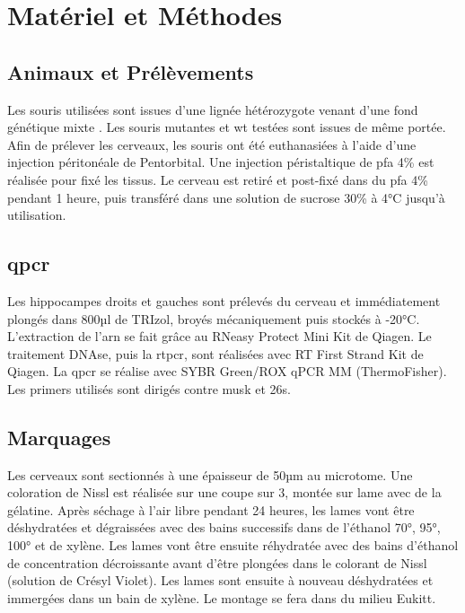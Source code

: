 \chapter{Matériel et Méthodes}

\section{Animaux et Prélèvements}
\label{sec:AnimEtPrelev}
	Les souris utilisées sont issues d'une lignée hétérozygote venant d'une fond génétique mixte \cite{Messeant2015, Messeant2017}. Les souris mutantes \mcrd et \gls{wt} testées sont issues de même portée. Afin de prélever les cerveaux, les souris ont été euthanasiées à l'aide d'une injection péritonéale de Pentorbital. Une injection péristaltique de \gls{pfa} 4\% est réalisée pour fixé les tissus. Le cerveau est retiré et post-fixé dans du \gls{pfa} 4\% pendant 1 heure, puis transféré dans une solution de sucrose 30\% à 4°C jusqu'à utilisation.
	
\section{\acrshort{qpcr}}
\label{sec:qPCR}
	Les hippocampes droits et gauches sont prélevés du cerveau et immédiatement plongés dans 800µl de TRIzol\textregistered, broyés mécaniquement puis stockés à -20°C. L'extraction de l'\gls{arn} se fait grâce au RNeasy Protect Mini Kit de Qiagen\textregistered. Le traitement DNAse, puis la \gls{rtpcr}, sont réalisées avec RT First Strand Kit de Qiagen\textregistered. La \gls{qpcr} se réalise avec SYBR Green/ROX qPCR MM (ThermoFisher\textregistered). Les primers utilisés sont dirigés contre \gls{musk} et \acrshort{26s}.
	
\section{Marquages}
\label{sec:Marquages}
	Les cerveaux sont sectionnés à une épaisseur de 50µm au microtome. Une coloration de Nissl est réalisée sur une coupe sur 3, montée sur lame avec de la gélatine. Après séchage à l'air libre pendant 24 heures, les lames vont être déshydratées et dégraissées avec des bains successifs dans de l'éthanol 70°, 95°, 100° et de xylène. Les lames vont être ensuite réhydratée avec des bains d'éthanol de concentration décroissante avant d'être plongées dans le colorant de Nissl (solution de Crésyl Violet).  Les lames sont ensuite  à nouveau déshydratées et immergées dans un bain de xylène. Le montage se fera dans du milieu Eukitt\textregistered.
	
